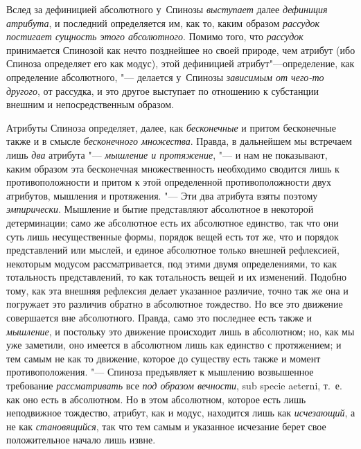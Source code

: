 Вслед за дефиницией абсолютного у~Спинозы
{\em выступает} далее
{\em дефиниция атрибута}, и последний определяется им,
как то, каким образом {\em рассудок постигает сущность
этого
абсолютного}.
Помимо того, что {\em рассудок} принимается Спинозой
как нечто позднейшее но своей природе, чем атрибут (ибо Спиноза определяет
его как модус), этой дефиницией атрибут"---определение, как определение
абсолютного, "--- делается у~Спинозы {\em зависимым от
чего-то другого}, от рассудка, и это другое выступает по отношению к
субстанции внешним и непосредственным образом.

Атрибуты Спиноза определяет, далее, как
{\em бесконечные} и притом бесконечные также и в смысле
{\em бесконечного множества}. Правда, в дальнейшем мы
встречаем лишь {\em два} атрибута
"--- {\em мышление и протяжение}, "--- и нам не показывают,
каким образом эта бесконечная множественность необходимо сводится лишь к
противоположности и притом к этой определенной противоположности двух
атрибутов, мышления и протяжения. "--- Эти два атрибута взяты поэтому
{\em эмпирически}. Мышление и бытие представляют
абсолютное в некоторой детерминации; само же абсолютное есть их абсолютное
единство, так что они суть лишь несущественные формы, порядок вещей есть
тот же, что и порядок представлений или мыслей, и единое абсолютное только
внешней рефлексией, некоторым модусом рассматривается, под этими двумя
определениями, то как тотальность представлений, то как тотальность вещей и
их изменений. Подобно тому, как эта внешняя рефлексия делает указанное
различие, точно так же она и погружает это различив обратно в абсолютное
тождество. Но все это движение совершается вне абсолютного. Правда, само
это последнее есть также и {\em мышление}, и постольку
это движение происходит лишь в абсолютном; но, как мы уже заметили, оно
имеется в абсолютном лишь как единство с протяжением; и тем самым не как то
движение, которое до существу есть также и момент противоположения. "---
Спиноза предъявляет к мышлению возвышенное требование
{\em рассматривать} все {\em под
образом вечности}, sub specie aeterni, т.~е. как оно есть в абсолютном. Но
в этом абсолютном, которое есть лишь неподвижное тождество, атрибут, как и
модус, находится лишь как {\em исчезающий}, а не как
{\em становящийся}, так что тем самым и указанное
исчезание берет свое положительное начало лишь извне.


